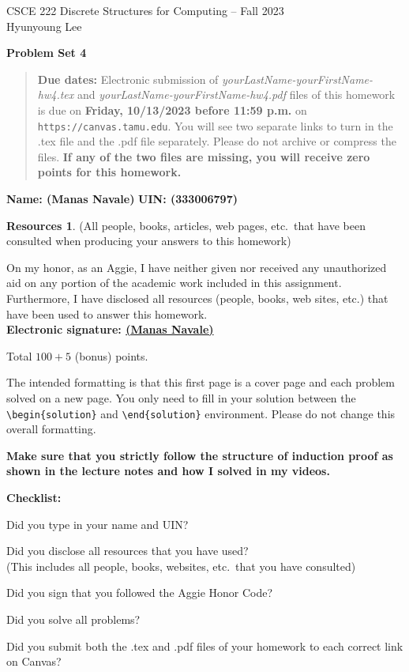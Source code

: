 \documentclass{article}
\theoremstyle{definition}
\newtheorem*{solution}{Solution}
\newtheorem*{resources}{Resources}
\newcommand{\name}[2]{\noindent\textbf{Name: #1}\hfill \textbf{UIN: #2}
  \newcommand{\myName}{#1}
  \newcommand{\myUIN}{#2}
}
\newcommand{\honor}{\noindent On my honor, as an Aggie, I have neither
  given nor received any unauthorized aid on any portion of the
  academic work included in this assignment. Furthermore, I have
  disclosed all resources (people, books, web sites, etc.) that have
  been used to answer this homework. \\[2ex]
  \textbf{Electronic signature: \underline{ (Manas Navale) } } } %
\newcommand{\checklist}{\noindent\textbf{Checklist:}
  \begin{compactitem}[$\Box$]
    \item Did you type in your name and UIN?
    \item Did you disclose all resources that you have used? \\ (This includes all
    people, books, websites, etc.\ that you have consulted)
    \item Did you sign that you followed the Aggie Honor Code?
    \item Did you solve all problems?
    \item Did you submit both the .tex and .pdf files of your homework to each correct
    link on Canvas?
  \end{compactitem}
}
\newcommand{\problemset}[1]{\begin{center}\textbf{Problem Set #1}\end{center}}
\newcommand{\duedate}[1]{\begin{quote}\textbf{Due dates:} Electronic
    submission of \textsl{yourLastName-yourFirstName-hw4.tex} and
    \textsl{yourLastName-yourFirstName-hw4.pdf} files of this homework is due on
    \textbf{#1} on \texttt{https://canvas.tamu.edu}. You will see two separate links
    to turn in the .tex file and the .pdf file separately. Please do not archive or compress the files.
    \textbf{If any of the two files are missing, you will receive zero points for this homework.}\end{quote} }
\begin{document}
\begin{center}
  {\large
    CSCE 222 Discrete Structures for Computing -- Fall 2023\\[.5ex]
    Hyunyoung Lee\\}
\end{center}
\problemset{4}
\duedate{Friday, 10/13/2023 before 11:59 p.m.}
\name{ (Manas Navale) }{ (333006797) } %

\begin{resources} (All people, books, articles, web pages, etc.\ that
  have been consulted when producing your answers to this homework)
\end{resources}
\honor

\bigskip

\noindent
Total $100+5$ (bonus) points.

\bigskip

\noindent
The intended formatting is that this first page is a cover page and each
problem solved on a new page. You only need to fill in your solution between
the \verb|\begin{solution}| and \verb|\end{solution}| environment.
Please do not change this overall formatting.

\bigskip

\noindent
\textbf{Make sure that you strictly follow the structure of induction proof as shown in the
  lecture notes and how I solved in my videos.}

\vfill
\checklist
\end{document}
